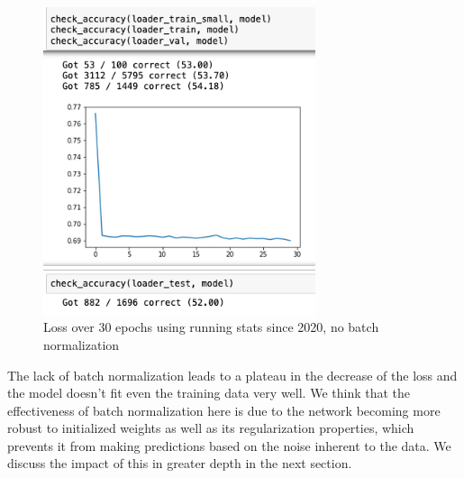 \documentclass[10pt,twocolumn,letterpaper]{article}
\begin{document}
\begin{figure}[htp]
    \centering
    \includegraphics[width=8cm]{results_2020_train_no-bn.png}
    \caption{Loss over 30 epochs using running stats since 2020, no batch normalization}
    \label{fig:fig_4}
\end{figure}

The lack of batch normalization leads to a plateau in the decrease of the loss and the model doesn't fit even the training data very well. We think that the effectiveness of batch normalization here is due to the network becoming more robust to initialized weights as well as its regularization properties, which prevents it from making predictions based on the noise inherent to the data. We discuss the impact of this in greater depth in the next section. \\



\end{document}
